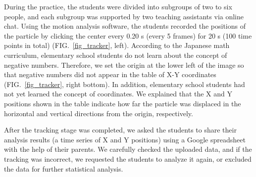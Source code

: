 \documentclass[10pt, aps, prb, preprint, longbibliography, superscriptaddress]{revtex4-2}
\newcommand{\figref}[1]{FIG.~\ref{#1}}
\begin{document}
During the practice, the students were divided into subgroups of two to six people,
and each subgroup was supported by two teaching assistants via online chat.
Using the motion analysis software,
the students recorded the positions of the particle by clicking the center every 0.20 s (every 5 frames)
for 20 s (100 time points in total) (\figref{fig_tracker}, left).
According to the Japanese math curriculum, elementary school students do not learn
about the concept of negative numbers.\cite{shido_elem}
Therefore, we set the origin at the lower left of the image
so that negative numbers did not appear in the table of X-Y coordinates (\figref{fig_tracker}, right bottom).
In addition, elementary school students had not yet learned the concept of coordinates.
We explained that the X and Y positions shown in the table indicate
how far the particle was displaced in the horizontal and vertical directions from the origin, respectively.

After the tracking stage was completed,
we asked the students to share their analysis results (a time series of X and Y positions)
using a Google spreadsheet with the help of their parents.
We carefully checked the uploaded data, and if the tracking was incorrect,
we requested the students to analyze it again, or excluded the data for further statistical analysis.
\end{document}
